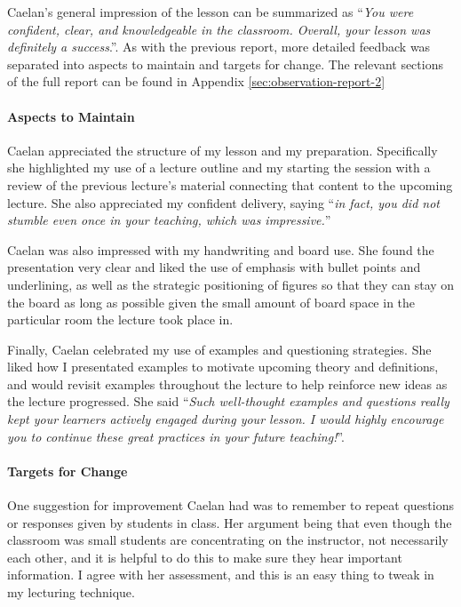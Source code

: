 \documentclass{article}
\begin{document}
Caelan's general impression of the lesson can be summarized as ``\emph{You were confident, clear, and
knowledgeable in the classroom. Overall, your lesson was definitely a success}.''. As with the previous report, more detailed feedback was separated into aspects to maintain and targets for change. The relevant sections of the full report can be found in Appendix \ref{sec:observation-report-2}
\paragraph{Aspects to Maintain}
Caelan appreciated the structure of my lesson and my preparation. Specifically she highlighted my use of a lecture outline and my starting the session with a review of the previous lecture's material connecting that content to the upcoming lecture. She also appreciated my confident delivery, saying ``\emph{in fact, you did not stumble even once in your teaching, which was impressive.}''

Caelan was also impressed with my handwriting and board use. She found the presentation very clear and liked the use of emphasis with bullet points and underlining, as well as the strategic positioning of figures so that they can stay on the board as long as possible given the small amount of board space in the particular room the lecture took place in.

Finally, Caelan celebrated my use of examples and questioning strategies. She liked how I presentated examples to motivate upcoming theory and definitions, and would revisit examples throughout the lecture to help reinforce new ideas as the lecture progressed. She said ``\emph{Such well-thought examples and questions really kept your learners actively engaged during your lesson. I would highly encourage you to continue these
great practices in your future teaching!}''.
\paragraph{Targets for Change}
One suggestion for improvement Caelan had was to remember to repeat questions or responses given by students in class. Her argument being that even though the classroom was small students are concentrating on the instructor, not necessarily each other, and it is helpful to do this to make sure they hear important information. I agree with her assessment, and this is an easy thing to tweak in my lecturing technique.
\end{document}

